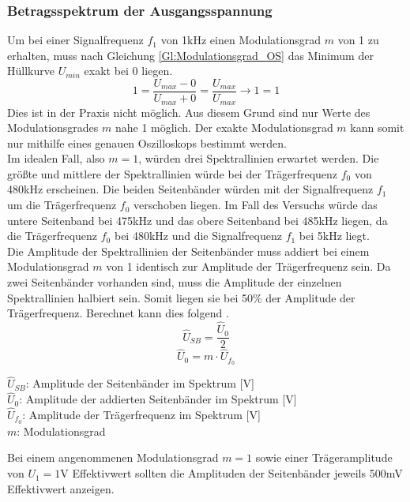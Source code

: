 \documentclass[12pt]{scrartcl}
\begin{document}
\subsubsection{Betragsspektrum der Ausgangsspannung}
\label{kap:2.3}
Um bei einer Signalfrequenz $f_1$ von 1kHz einen Modulationsgrad $m$ von 1 zu erhalten, muss nach Gleichung \ref{Gl:Modulationsgrad_OS} das Minimum der Hüllkurve $U_{min}$ exakt bei 0 liegen. 
\begin{equation*}
    1=\frac{U_{max}-0}{U_{max}+0}=\frac{U_{max}}{U_{max}} \rightarrow 1=1
    \label{}
\end{equation*}   
Dies ist in der Praxis nicht möglich. 
Aus diesem Grund sind nur Werte des Modulationsgrades $m$ nahe 1 möglich.
Der exakte Modulationsgrad $m$ kann somit nur mithilfe eines genauen Oszilloskops bestimmt werden.\\
Im idealen Fall, also $m=1$, würden drei Spektrallinien erwartet werden.
Die größte und mittlere der Spektrallinien würde bei der Trägerfrequenz $f_0$ von 480kHz erscheinen. 
Die beiden Seitenbänder würden mit der Signalfrequenz $f_1$ um die Trägerfrequenz $f_0$ verschoben liegen. 
Im Fall des Versuchs würde das untere Seitenband bei 475kHz und das obere Seitenband bei 485kHz liegen, da die Trägerfrequenz $f_0$ bei 480kHz und die Signalfrequenz $f_1$ bei 5kHz liegt.\\
Die Amplitude der Spektrallinien der Seitenbänder muss addiert bei einem Modulationsgrad $m$ von 1 identisch zur Amplitude der Trägerfrequenz sein. 
Da zwei Seitenbänder vorhanden sind, muss die Amplitude der einzelnen Spektrallinien halbiert sein. 
Somit liegen sie bei 50\% der Amplitude der Trägerfrequenz.
Berechnet kann dies folgend \cite{Seitenband}.
\begin{equation}
    \hat{U}_{SB}=\frac{\hat{U}_0}{2}
    \label{Gl:SB}
\end{equation}
\begin{equation}
    \hat{U}_0=m \cdot \hat{U}_{f_0}
    \label{Gl:Höhe_Spektrallinien}
\end{equation}
\begin{center}
    $\hat{U}_{SB}$: Amplitude der Seitenbänder im Spektrum [V]        \\
    $\hat{U}_0$: Amplitude der addierten Seitenbänder im Spektrum [V]        \\
    $\hat{U}_{f_0}$: Amplitude der Trägerfrequenz im Spektrum [V]\\
    $m$: Modulationsgrad 
\end{center}
Bei einem angenommenen Modulationsgrad $m=1$ sowie einer Trägeramplitude von $U_1=1$V Effektivwert sollten die Amplituden der Seitenbänder jeweils 500mV Effektivwert anzeigen. 
\bigskip
\end{document}
